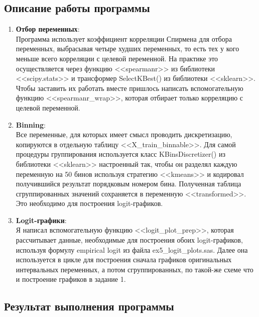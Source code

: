 \documentclass[12pt,a4paper]{article}
\begin{document}
  \subsection{Описание работы программы}
  \begin{enumerate}
    \item \textbf{Отбор переменных}: \\
      Программа использует коэффициент корреляции Спирмена для отбора переменных,
      выбрасывая четыре худших переменных, то есть тех у кого меньше всего корреляции с целевой переменной.
      На практике это осуществляется через функцию <<spearmanr>> из библиотеки <<scipy.stats>>
      и трансформер SelectKBest() из библиотеки <<sklearn>>.
      Чтобы заставить их работать вместе пришлось написать вспомогательную функцию <<spearmanr\_wrap>>,
      которая отбирает только корреляцию с целевой переменной.
    \item \textbf{Binning}: \\
      Все переменные, для которых имеет смысл проводить дискретизацию,
      копируются в отдельную таблицу <<X\_train\_binnable>>.
      Для самой процедуры группирования используется класс KBinsDiscretizer() из библиотеки <<sklearn>>
      настроенный так, чтобы он разделял каждую переменную на 50 бинов используя стратегию <<kmeans>>
      и кодировал получившийся результат порядковым номером бина.
      Полученная таблица сгруппированных значений сохраняется в переменную <<transformed>>.
      Это необходимо для построения logit-графиков.
    \item \textbf{Logit-графики}: \\
      Я написал вспомогательную функцию <<logit\_plot\_prep>>, которая рассчитывает данные,
      необходимые для построения обоих logit-графиков, используя формулу empirical logit из файла
      ex5\_logit\_plots.sas.
      Далее она используется в цикле для построения сначала графиков оригинальных интервальных переменных,
      а потом сгруппированных, по такой-же схеме что и построение графиков в задание 1.
  \end{enumerate}

  \subsection{Результат выполнения программы}
\end{document}

